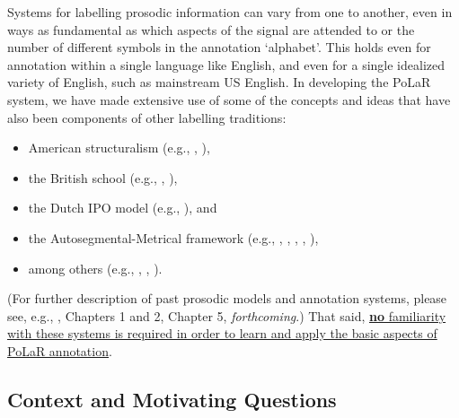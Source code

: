 \documentclass[11pt, twoside]{memoir}
\begin{document}
Systems for labelling prosodic information can vary from one to another, even in ways as fundamental as which aspects of the signal are attended to or the number of different symbols in the annotation ‘alphabet’. This holds even for annotation within a single language like English, and even for a single idealized variety of English, such as mainstream US English. In developing the PoLaR system, we have made extensive use of some of the concepts and ideas that have also been components of other labelling traditions:

\begin{itemize}
\item American structuralism (e.g., \citealt{pike45}, \citealt{tragersmith51}),
\item the British school (e.g., \citealt{crystal69}, \citealt{oconnorarnold73}),
\item the Dutch IPO model (e.g., \citealt{t-hart-90}), and
\item the Autosegmental-Metrical framework (e.g., \citealt{pierrehumbert80}, \citealt{beckmanayers97}, \citealt{grabe-01}, \citealt{hualdeprieto16}, \citealt{dilleybreen18}),
\item among others (e.g., \citealt{hirst07}, \citealt{taylor98}, \citealt{xu12}).
\end{itemize}

(For further description of past prosodic models and annotation systems, please see, e.g., \citealt{roach94}, \citealt{ladd08} Chapters 1 and 2, \citealt{fery17} Chapter 5, \citeauthor{barnesshattuckhufnagel20} \textit{forthcoming}.) That said, \uline{\textbf{no} familiarity with these systems is required in order to learn and apply the basic aspects of PoLaR annotation}.

\subsection{Context and Motivating Questions}\label{sec:context-and-motivating-questions}
\end{document}

